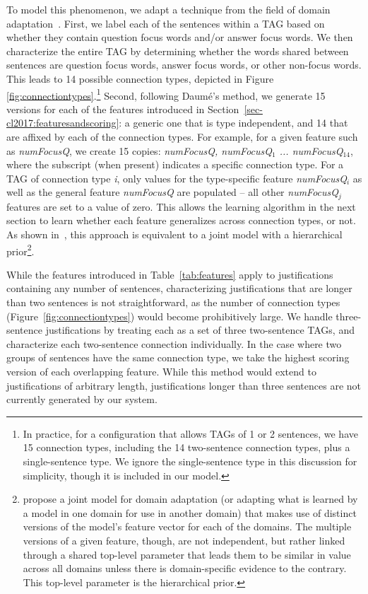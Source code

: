 To model this phenomenon, we adapt a technique from the field of domain adaptation~\citep{daume2007}.
First, we label each of the sentences within a TAG based on whether they contain question focus words and/or answer focus words.  We then characterize the entire TAG by determining whether the words shared between sentences are question focus words, answer focus words, or other non-focus words.  This leads to 14 possible connection types, depicted in Figure \ref{fig:connectiontypes}.\footnote{In practice, for a configuration that allows TAGs of 1 or 2 sentences, we have 15 connection types, including the 14 two-sentence connection types, plus a single-sentence type. We ignore the single-sentence type in this discussion for simplicity, though it is included in our model.}
Second, following Daum{\'e}'s method, we generate 15 versions for each of the features introduced in Section~\ref{sec-cl2017:featuresandscoring}: a generic one that is type independent, and 14 that are affixed by each of the connection types. For example, for a given feature such as \emph{numFocusQ}, we create 15 copies: \emph{numFocusQ, numFocusQ$_1$ ... numFocusQ$_{14}$}, where the subscript (when present) indicates a specific connection type. For a TAG of connection type \emph{i}, only values for the type-specific feature \emph{numFocusQ$_i$} as well as the general feature \emph{numFocusQ} are populated -- all other \emph{numFocusQ$_j$} features are set to a value of zero. This allows the learning algorithm in the next section to learn whether each feature generalizes across connection types, or not. As shown in~\citet{finkel2010hierarchical}, this approach is equivalent to a joint model with a hierarchical prior\footnote{\citet{finkel2010hierarchical} propose a joint model for domain adaptation (or adapting what is learned by a model in one domain for use in another domain) that makes use of distinct versions of the model's feature vector for each of the domains.  The multiple versions of a given feature, though, are not independent, but rather linked through a shared top-level parameter that leads them to be similar in value across all domains unless there is domain-specific evidence to the contrary.  This top-level parameter is the hierarchical prior.}. 



While the features introduced in Table~\ref{tab:features} apply to justifications containing any number of sentences, characterizing justifications that are longer than two sentences is not straightforward, as the number of connection types (Figure~\ref{fig:connectiontypes}) would become prohibitively large.   We handle three-sentence justifications by treating each as a set of three two-sentence TAGs, and characterize each two-sentence connection individually.  In the case where two groups of sentences have the same connection type, we take the highest scoring version of each overlapping feature.  While this method would extend to justifications of arbitrary length,  justifications longer than three sentences are not currently generated by our system. 


